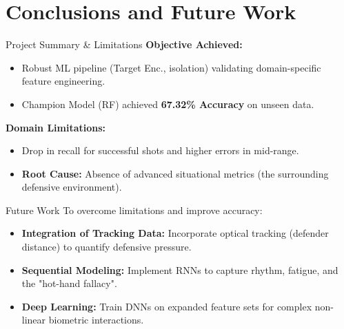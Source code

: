\section{Conclusions and Future Work}

\begin{frame}{Project Summary \& Limitations}
    \textbf{Objective Achieved:}
    \begin{itemize}
        \item Robust ML pipeline (Target Enc., isolation) validating domain-specific feature engineering.
        \item Champion Model (RF) achieved \textbf{67.32\% Accuracy} on unseen data.
    \end{itemize}
    \vspace{0.3cm}
    \textbf{Domain Limitations:}
    \begin{itemize}
        \item Drop in recall for successful shots and higher errors in mid-range.
        \item \textbf{Root Cause:} Absence of advanced situational metrics (the surrounding defensive environment).
    \end{itemize}
\end{frame}

\begin{frame}{Future Work}
    To overcome limitations and improve accuracy:
    \begin{itemize}
        \item \textbf{Integration of Tracking Data:} Incorporate optical tracking (defender distance) to quantify defensive pressure.
        \item \textbf{Sequential Modeling:} Implement RNNs to capture rhythm, fatigue, and the "hot-hand fallacy".
        \item \textbf{Deep Learning:} Train DNNs on expanded feature sets for complex non-linear biometric interactions.
    \end{itemize}
\end{frame}